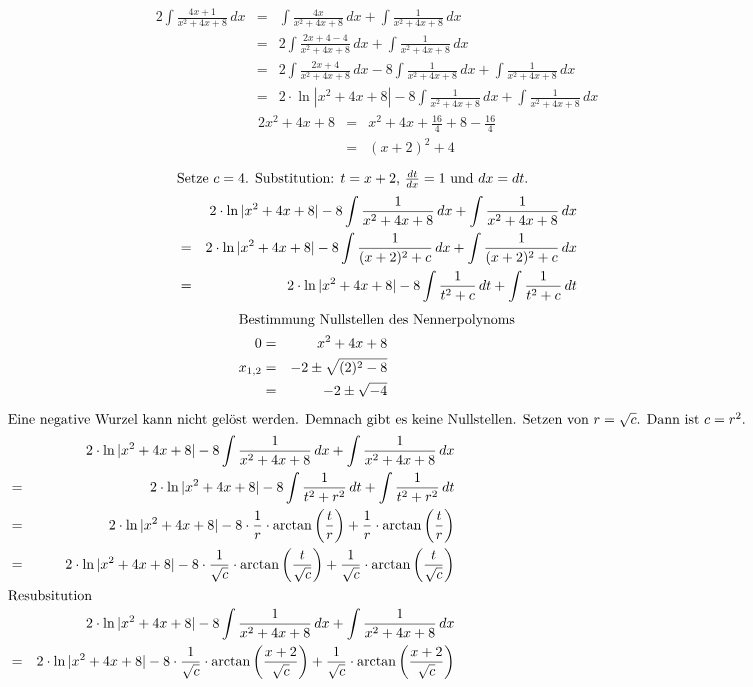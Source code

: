 \documentclass[10pt,a4paper,oneside,ngerman,numbers=noenddot]{scrartcl}
\begin{document}
\subsubsection{} %
\begin{alignat*}{2}
\int \frac{4x + 1}{x^{2} + 4x +8}\,dx &=& \int \frac{4x}{x^{2} + 4x + 8}\,dx + \int \frac{1}{x^{2} + 4x + 8}\,dx \\
&=& 2\int \frac{2x +4 - 4}{x^{2} + 4x + 8}\,dx + \int \frac{1}{x^{2} + 4x + 8}\,dx \\
&=& 2\int \frac{2x + 4}{x^{2} + 4x + 8}\,dx - 8\int \frac{1}{x^{2} + 4x + 8}\,dx + \int \frac{1}{x^{2} + 4x + 8}\,dx \\
&=& 2 \cdot \ln |x^{2} + 4x + 8| - 8\int \frac{1}{x^{2} + 4x + 8}\,dx + \int \frac{1}{x^{2} + 4x + 8}\,dx
\end{alignat*}
\begin{alignat*}{2}
x^{2} + 4x + 8 &=& x^{2} + 4x + \frac{16}{4} + 8 - \frac{16}{4} \\
&=& (x +2)^{2} + 4
\end{alignat*}
\begin{alignat*}{2}
\intertext{Setze $c = 4$. Substitution: $t = x + 2$, $\frac{dt}{dx} = 1$ und $dx = dt$.}
&& 2 \cdot \ln |x^{2} + 4x + 8| - 8\int \frac{1}{x^{2} + 4x + 8}\,dx + \int \frac{1}{x^{2} + 4x + 8}\,dx\\
&=& 2 \cdot \ln |x^{2} + 4x + 8| -8\int \frac{1}{(x+2)^{2} + c}\,dx + \int \frac{1}{(x+2)^{2} + c}\,dx \\
&=& 2 \cdot \ln |x^{2} + 4x + 8| -8\int \frac{1}{t^{2} + c}\,dt + \int \frac{1}{t^{2} + c}\,dt
\end{alignat*}
\begin{alignat*}{2}
\intertext{Bestimmung Nullstellen des Nennerpolynoms}
0 &=& x^{2} + 4x + 8 \\
x_{1,2} &=& -2 \pm \sqrt{(2)^{2} - 8} \\
&=& -2 \pm \sqrt{-4}
\end{alignat*}
\begin{alignat*}{2}
\intertext{Eine negative Wurzel kann nicht gelöst werden. Demnach gibt es keine Nullstellen. Setzen von $r = \sqrt{c}$. Dann ist $c = r^{2}$.}
&& 2 \cdot \ln |x^{2} + 4x + 8| - 8\int \frac{1}{x^{2} + 4x + 8}\,dx + \int \frac{1}{x^{2} + 4x + 8}\,dx\\
&=& 2 \cdot \ln |x^{2} + 4x + 8| -8\int \frac{1}{t^{2} + r^{2}}\,dt + \int \frac{1}{t^{2} + r^{2}}\,dt \\
&=& 2 \cdot \ln |x^{2} + 4x + 8| -8 \cdot \frac{1}{r} \cdot \arctan \left(\frac{t}{r} \right) + \frac{1}{r} \cdot \arctan \left(\frac{t}{r} \right) \\
&=& 2 \cdot \ln |x^{2} + 4x + 8| -8 \cdot \frac{1}{\sqrt{c}} \cdot \arctan \left(\frac{t}{\sqrt{c}} \right) + \frac{1}{\sqrt{c}} \cdot \arctan \left(\frac{t}{\sqrt{c}} \right) \\
\intertext{Resubsitution}
&& 2 \cdot \ln |x^{2} + 4x + 8| - 8\int \frac{1}{x^{2} + 4x + 8}\,dx + \int \frac{1}{x^{2} + 4x + 8}\,dx \\ 
&=& 2 \cdot \ln |x^{2} + 4x + 8| -8 \cdot \frac{1}{\sqrt{c}} \cdot \arctan \left(\frac{x+2}{\sqrt{c}} \right) + \frac{1}{\sqrt{c}} \cdot \arctan \left(\frac{x+2}{\sqrt{c}} \right)
\end{alignat*}
\end{document}
